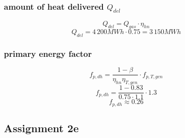 \documentclass{article}
\begin{document}
		\subsubsection*{amount of heat delivered $Q_{del}$}
			$$Q_{del}=Q_{gas}\cdot \eta_{hn}$$
			$$Q_{del}=4\,200MWh\cdot 0.75 = 3\,150MWh$$
		\subsubsection*{primary energy factor}
			$$f_{p,dh}=\frac{1-\beta}{\eta_{hn}\eta_{T,gen}}\cdot f_{p,T,gen}$$
			$$f_{p,dh}=\frac{1-0.83}{0.75\cdot 1.1}\cdot 1.3$$
			$$f_{p,dh}\approx 0.26$$

	\newpage
	\subsection*{Assignment 2e}
\end{document}
